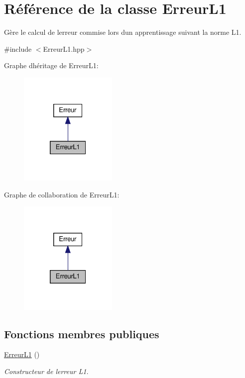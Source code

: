 \hypertarget{class_erreur_l1}{}\section{Référence de la classe Erreur\+L1}
\label{class_erreur_l1}


Gère le calcul de l\textquotesingle{}erreur commise lors d\textquotesingle{}un apprentissage suivant la norme L1.  




{\ttfamily \#include $<$Erreur\+L1.\+hpp$>$}



Graphe d\textquotesingle{}héritage de Erreur\+L1\+:\nopagebreak
\begin{figure}[H]
\begin{center}
\leavevmode
\includegraphics[width=133pt]{class_erreur_l1__inherit__graph}
\end{center}
\end{figure}


Graphe de collaboration de Erreur\+L1\+:\nopagebreak
\begin{figure}[H]
\begin{center}
\leavevmode
\includegraphics[width=133pt]{class_erreur_l1__coll__graph}
\end{center}
\end{figure}
\subsection*{Fonctions membres publiques}
\begin{DoxyCompactItemize}
\item 
\mbox{\label{class_erreur_l1_ac22fa445742caeefafa848de6db282bf}} 
\hyperlink{class_erreur_l1_ac22fa445742caeefafa848de6db282bf}{Erreur\+L1} ()
\begin{DoxyCompactList}\small\item\em Constructeur de l\textquotesingle{}erreur L1. \end{DoxyCompactList}\end{DoxyCompactItemize}


